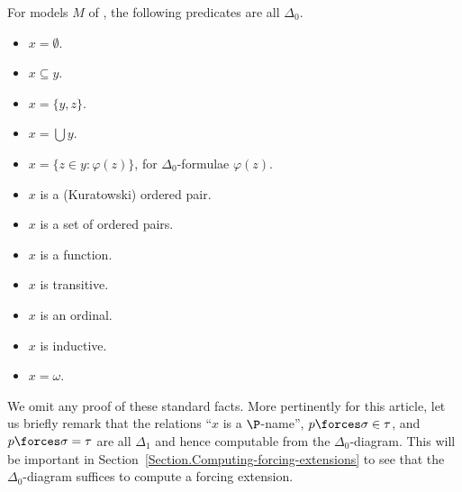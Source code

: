 \documentclass{amsart}
\begin{document}
\begin{lemma}
\label{lemma:Delta1}
For models $M$ of \ZFC, the following predicates are all $\Delta_0$.
\begin{multicols}{2}
\begin{itemize}
\item $x=\emptyset$.
\item $x \subseteq y$.
\item $x = \{y,z\}$.
\item $x = \bigcup y$.
\item $x = \{ z \in y : \varphi(z) \}$, for $\Delta_0$-formulae $\varphi(z)$.
\item $x$ is a (Kuratowski) ordered pair.
\item $x$ is a set of ordered pairs.
\item $x$ is a function.
\item $x$ is transitive.
\item $x$ is an ordinal.
\item $x$ is inductive.
\item $x=\omega$.
\end{itemize}
\end{multicols}
\end{lemma}
We omit any proof of these standard facts. More pertinently for this article, let us briefly remark that the relations ``$x$ is a $\P$-name'', $p \forces \sigma \in \tau$, and $p \forces \sigma = \tau$ are all $\Delta_1$ and hence computable from the $\Delta_0$-diagram. This will be important in Section~\ref{Section.Computing-forcing-extensions} to see that the $\Delta_0$-diagram suffices to compute a forcing extension.
\end{document}
